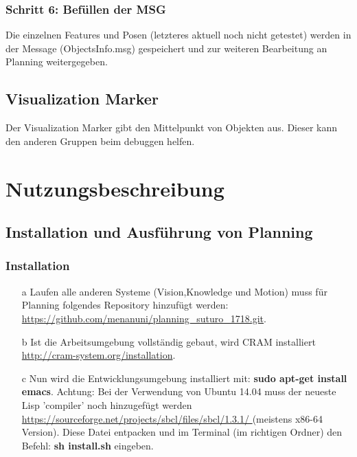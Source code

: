 \documentclass{suturo}
\begin{document}
\subsubsection{Schritt 6: Befüllen der MSG}
Die einzelnen Features und Posen (letzteres aktuell noch nicht getestet) werden in der Message (ObjectsInfo.msg) gespeichert und zur weiteren Bearbeitung an Planning weitergegeben.

\subsection*{Visualization Marker}
Der Visualization Marker gibt den Mittelpunkt von Objekten aus. Dieser kann den anderen Gruppen beim debuggen helfen.

\newpage
\section{Nutzungsbeschreibung}

\subsection{Installation und Ausführung von Planning}

\subsubsection{Installation}
\begin{itemize}


\item[a] Laufen alle anderen Systeme (Vision,Knowledge und Motion) muss für Planning folgendes Repository hinzufügt werden: \url{https://github.com/menanuni/planning_suturo_1718.git}. 

\item[b] Ist die Arbeitsumgebung vollständig gebaut, wird CRAM installiert \url{http://cram-system.org/installation}.

\item[c] Nun wird die Entwicklungsumgebung installiert mit: \textbf{sudo apt-get install emacs}. Achtung: Bei der Verwendung von Ubuntu 14.04 muss der neueste Lisp 'compiler' noch hinzugefügt werden \url{https://sourceforge.net/projects/sbcl/files/sbcl/1.3.1/
} (meistens x86-64 Version). Diese Datei entpacken und im Terminal (im richtigen Ordner) den Befehl: \textbf{sh install.sh} eingeben.
\end{itemize}
\end{document}
